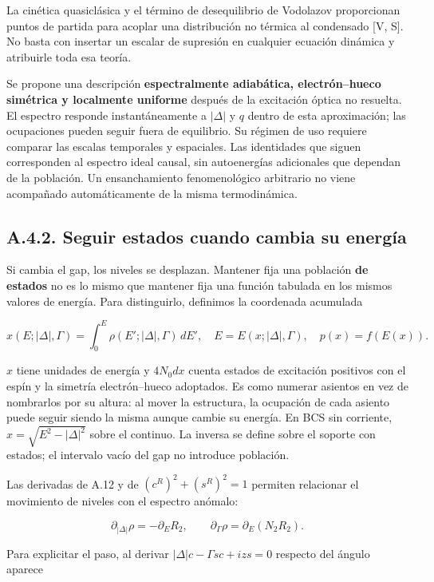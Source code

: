 \documentclass[
  spanish,
  10pt,
  a4paper,
]{article}
\begin{document}
La cinética quasiclásica y el término de desequilibrio de Vodolazov
proporcionan puntos de partida para acoplar una distribución no térmica
al condensado {[}V, S{]}. No basta con insertar un escalar de supresión
en cualquier ecuación dinámica y atribuirle toda esa teoría.

Se propone una descripción \textbf{espectralmente adiabática,
electrón--hueco simétrica y localmente uniforme} después de la
excitación óptica no resuelta. El espectro responde instantáneamente a
\(|\Delta|\) y \(q\) dentro de esta aproximación; las ocupaciones pueden
seguir fuera de equilibrio. Su régimen de uso requiere comparar las
escalas temporales y espaciales. Las identidades que siguen corresponden
al espectro ideal causal, sin autoenergías adicionales que dependan de
la población. Un ensanchamiento fenomenológico arbitrario no viene
acompañado automáticamente de la misma termodinámica.

\subsection{A.4.2. Seguir estados cuando cambia su
energía}\label{a.4.2.-seguir-estados-cuando-cambia-su-energuxeda}

Si cambia el gap, los niveles se desplazan. Mantener fija una población
\textbf{de estados} no es lo mismo que mantener fija una función
tabulada en los mismos valores de energía. Para distinguirlo, definimos
la coordenada acumulada

\[
x(E;|\Delta|,\Gamma)=\int_0^E\rho(E';|\Delta|,\Gamma)\,dE',
\quad E=E(x;|\Delta|,\Gamma),\quad p(x)=f(E(x)).
\tag{A.15}
\]

\(x\) tiene unidades de energía y \(4N_0dx\) cuenta estados de
excitación positivos con el espín y la simetría electrón--hueco
adoptados. Es como numerar asientos en vez de nombrarlos por su altura:
al mover la estructura, la ocupación de cada asiento puede seguir siendo
la misma aunque cambie su energía. En BCS sin corriente,
\(x=\sqrt{E^2-|\Delta|^2}\) sobre el continuo. La inversa se define
sobre el soporte con estados; el intervalo vacío del gap no introduce
población.

Las derivadas de A.12 y de \((c^R)^2+(s^R)^2=1\) permiten relacionar el
movimiento de niveles con el espectro anómalo:

\[
\partial_{|\Delta|}\rho=-\partial_E R_2,
\qquad \partial_\Gamma\rho=\partial_E(N_2R_2).
\tag{A.16}
\]

Para explicitar el paso, al derivar \(|\Delta|c-\Gamma sc+izs=0\)
respecto del ángulo aparece
\end{document}
